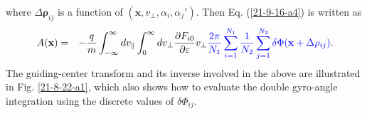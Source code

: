 \documentclass{llncs}
\newcommand{\tmcolor}[2]{{\color{#1}{#2}}}
\begin{document}
where $\Delta \mathbf{\rho}_{i j}$ is a function of $(\mathbf{x}, v_{\perp},
\alpha_i, \alpha_j')$. Then Eq. (\ref{21-9-16-a4}) is written as
\begin{eqnarray}
  A (\mathbf{x}) & = & - \frac{q}{m}  \int_{- \infty}^{\infty} d v_{\parallel}
  \int_0^{\infty} d v_{\perp} \frac{\partial F_{i 0}}{\partial \varepsilon}
  v_{\perp} \tmcolor{blue}{\frac{2 \pi}{N_1} \sum_{i = 1}^{N_1} \frac{1}{N_2} 
  \sum_{j = 1}^{N_2} \delta \Phi (\mathbf{x} + \Delta \mathbf{\rho}_{i j})} . 
  \label{22-11-8-1}
\end{eqnarray}
The guiding-center transform and its inverse involved in the above are
illustrated in Fig. \ref{21-8-22-a1}, which also shows how to evaluate the
double gyro-angle integration using the discrete values of $\delta \Phi_{i
j}$.

\
\end{document}

